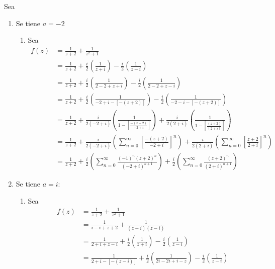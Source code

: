 \begin{problema}
\begin{enumerate}
        \begin{sol}
            Sea 
            \begin{enumerate}
                \item Se tiene $a=-2$
                \begin{enumerate}
                    \item Sea 
                    \begin{align*}
                        f(z) &= \frac{1}{z+2}+\frac{1}{z^2+1}\\
                             &= \frac{1}{z+2}+\frac{i}{2}\left(\frac{1}{z+i}\right)-\frac{i}{2}\left(\frac{1}{z-i}\right)\\
                             &= \frac{1}{z+2}+\frac{i}{2}\left(\frac{1}{2-2+z+i}\right)-\frac{i}{2}\left(\frac{1}{2-2+z-i}\right)\\
                             &= \frac{1}{z+2}+\frac{i}{2}\left(\frac{1}{-2+i-\left[-(z+2)\right]}\right)-\frac{i}{2}\left(\frac{1}{-2-i-\left[-(z+2)\right]}\right)\\
                             &= \frac{1}{z+2}+\frac{i}{2(-2+i)}\left(\frac{1}{1-\left[\frac{-(z+2)}{-2+i}\right]}\right)+\frac{i}{2(2+i)}\left(\frac{1}{1-\left[\frac{(z+2)}{(2+i)}\right]}\right)\\
                             &= \frac{1}{z+2}+\frac{i}{2(-2+i)}\left(\sum_{n=0}^\infty\left[\frac{-(z+2)}{-2+i}\right]^n\right)+ \frac{i}{2(2+i)}\left(\sum_{n=0}^\infty \left[\frac{z+2}{2+i}\right]^n\right)\\
                             &= \frac{1}{z+2}+\frac{i}{2}\left(\sum_{n=0}^\infty\frac{(-1)^n(z+2)^n}{(-2+i)^{n+1}}\right)+ \frac{i}{2}\left(\sum_{n=0}^\infty \frac{(z+2)^n}{(2+i)^{n+1}}\right)
                    \end{align*}
                \end{enumerate}
                \item Se tiene $a=i$:
                \begin{enumerate}
                    \item Sea 
                    \begin{align*}
                        f(z) &= \frac{1}{z+2}+\frac{1}{z^2+1}\\
                             &= \frac{1}{i-i+z+2}+\frac{1}{(z+i)(z-i)}\\
                             &= \frac{1}{2+i+z-i}+\frac{i}{2}\left(\frac{1}{z+i}\right)-\frac{i}{2}\left(\frac{1}{z-i}\right)\\
                             &= \frac{1}{2+i-[-(z-i)]}+\frac{i}{2}\left(\frac{1}{2i-2i+i-z}\right)-\frac{i}{2}\left(\frac{1}{z-i}\right)\\

\end{align*}
\end{enumerate}
\end{enumerate}
\end{sol}
\end{enumerate}
\end{problema}
